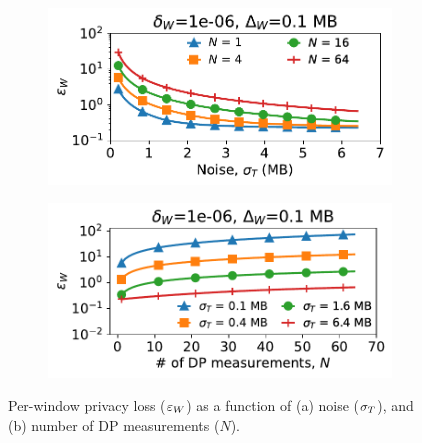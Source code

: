 \begin{figure}[t]
  \centering
  \begin{subfigure}{0.49\columnwidth}
      \centering
      \includegraphics[width=\textwidth]{plots/privacy_loss_VS_noise_std_low_sensitivity.pdf}
      \caption{}
      \label{subfig:low-sensitivity-epsilon-sigma}
  \end{subfigure}
  \hfill
  \begin{subfigure}{0.49\columnwidth}
      \centering
      \includegraphics[width=\textwidth]{plots/privacy_loss_VS_query_num_low_sensitivity.pdf}
      \caption{}
      \label{subfig:low-sensitivity-epsilon-queries}
  \end{subfigure}
  \caption{
    Per-window privacy loss ($\varepsilon_{W}$) as a function of
    (a) noise ($\sigma_T$), and (b) number of DP measurements ($N$).
  }
  \label{fig:privacy-microbenchmarks-low-sensitivity}
\end{figure}